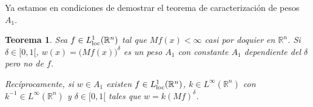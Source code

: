 \documentclass[12pt,english]{article}
\newtheorem{theorem}{Teorema}
\theoremstyle{definition}
\theoremstyle{remark}
\begin{document}
\begin{comment}
La siguiente observación es necesaria. Cuando dilatamos un cubo diádico manteniendo su centro y doblando su lado no obtenemos necesariamente un cubo diádico, puesto que los vértices puede que no estén en el retículo $(2^{-k}\mathbb{Z})^n$ siendo $2^{-k}$ la longitud del nuevo lado. En el siguiente dibujo se muestra un ejemplo: Dividimos el cubo azul obteniendo los cuatro cubos de la siguiente generación que están contenidos en él. Si dilatamos el cubo morado de abajo a la izquierda duplicando su lado y manteniendo su centro obtenemos el cubo verde, que no puede ser diádico porque interseca con el azul sin que ninguno de ellos esté contenido en el otro.

\begin{center}
	\texttt{[image: imgs/no-diadico]}
\end{center}

Lo que sí ocurre es que el cubo resultante de la dilatación es la unión disjunta del cubo morado y de varios cubos diádicos alrededor. Son de la generación posterior al morado, con la mitad de lado. En el siguiente dibujo el cubo original es el azul y el dilatado el rojo. El rojo es unión del azul con varios cubos alrededor, representamos algunos de ellos en azul claro. 

\begin{center}
	\texttt{[image: imgs/union-diadicos]}
\end{center}

Si ahora quisiésemos un cubo con el triple de lado que el cubo diádico original (azul), podríamos añadir otra capa de cubos diádicos del tamaño de los celestes alrededor, lo mismo para el cuádruple y así sucesivamente. Esto es válido también en dimensión mayor que dos. Por último, notemos que si un cubo es unión disjunta de diádicos: $Q'=Q_1\cup \cdots \cup Q_m$, para cada $f\in L^1_{\rm loc}(\mathbb{R}^n)$ y cada $x\in Q'$ se tiene TODO
\begin{equation}
\frac{1}{|Q'|}\int_{Q'}|f|=\frac{1}{|Q'|}\sum_{j=1}^m \int_{Q_j}|f|\leq \frac{1}{|Q'|}\int_{Q'}|f|
\end{equation}
\end{comment}

Ya estamos en condiciones de demostrar el teorema de caracterización de pesos $A_1$.

\begin{theorem}\label{thm: A1 characterization} Sea $f\in L^1_{\rm loc}(\mathbb{R}^n)$ tal que $Mf(x)<\infty$ casi por doquier en $\mathbb{R}^n$. Si $\delta\in[0,1[$, $w(x)=\big(Mf(x)\big)^\delta$ es un peso $A_1$ con constante $A_1$ dependiente del $\delta$ pero no de $f$.
	
Recíprocamente, si $w\in A_1$ existen $f\in L^1_{\rm loc}(\mathbb{R}^n)$, $k\in L^\infty(\mathbb{R}^n)$ con $k^{-1}\in L^\infty(\mathbb{R}^n)$ y $\delta\in[0,1[$ tales que $w=k(Mf)^\delta$.
\end{theorem}
\end{document}
